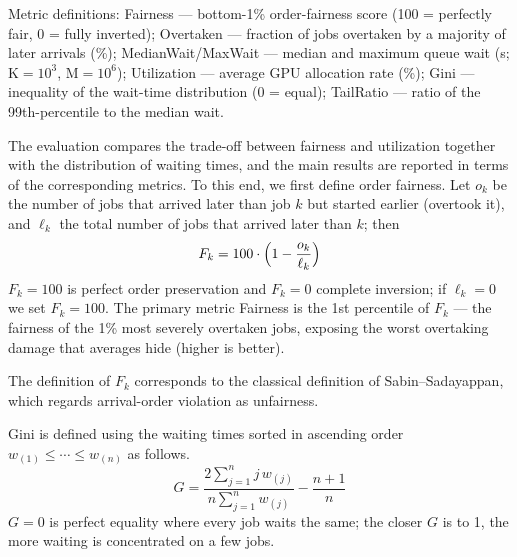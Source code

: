 \documentclass{ieeetj}
\begin{document}
\begin{table}[htb!]
\centering
\caption{Per-job lifecycle overhead.}
\label{tab:overhead}
\small
{}
\end{table}

\noindent Metric definitions: Fairness --- bottom-1\% order-fairness score (100 = perfectly fair, 0 = fully inverted); Overtaken --- fraction of jobs overtaken by a majority of later arrivals (\%); MedianWait/MaxWait --- median and maximum queue wait (s; K$=10^3$, M$=10^6$); Utilization --- average GPU allocation rate (\%); Gini --- inequality of the wait-time distribution (0 = equal); TailRatio --- ratio of the 99th-percentile to the median wait.

The evaluation compares the trade-off between fairness and utilization together with the distribution of waiting times, and the main results are reported in terms of the corresponding metrics. To this end, we first define order fairness. Let $o_k$ be the number of jobs that arrived later than job $k$ but started earlier (overtook it), and $\ell_k$ the total number of jobs that arrived later than $k$; then
\begin{equation}
F_k = 100\cdot\Bigl(1 - \frac{o_k}{\ell_k}\Bigr)
\label{eq:order-fair}
\end{equation}
$F_k=100$ is perfect order preservation and $F_k=0$ complete inversion; if $\ell_k=0$ we set $F_k=100$. The primary metric Fairness is the 1st percentile of $F_k$ --- the fairness of the 1\% most severely overtaken jobs, exposing the worst overtaking damage that averages hide (higher is better).

The definition of $F_k$ corresponds to the classical definition of Sabin--Sadayappan\cite{sabin2005unfairness}, which regards arrival-order violation as unfairness.

Gini is defined using the waiting times sorted in ascending order $w_{(1)}\le\cdots\le w_{(n)}$ as follows.
\begin{equation}
G = \frac{2\sum_{j=1}^{n} j\,w_{(j)}}{n\sum_{j=1}^{n} w_{(j)}} - \frac{n+1}{n}
\label{eq:gini}
\end{equation}
$G=0$ is perfect equality where every job waits the same; the closer $G$ is to 1, the more waiting is concentrated on a few jobs.
\end{document}
